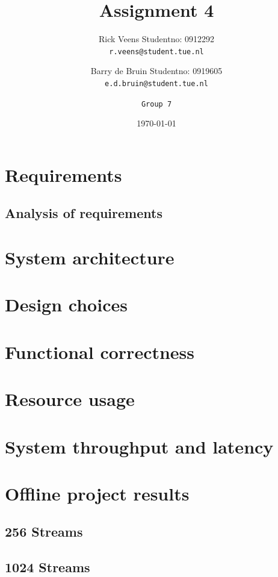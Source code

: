 \documentclass[a4paper,twoside,11pt, fleqn]{article}
\title{\vspace{-\baselineskip}\sffamily\bfseries Assignment 4}
\author{
	Rick Veens \qquad Studentno: 0912292\\
	\texttt{r.veens@student.tue.nl}
	\and
	Barry de Bruin \qquad Studentno: 0919605\\
	\texttt{e.d.bruin@student.tue.nl}
	\and
	\texttt{Group 7}
}
\date{\today}
\begin{document}
\maketitle
\newpage

\tableofcontents

\newpage

\section{Requirements}
\subsection{Analysis of requirements}
\section{System architecture}
\section{Design choices}
\section{Functional correctness}
\section{Resource usage}
\section{System throughput and latency}
\section{Offline project results}
\subsection{256 Streams}
\subsection{1024 Streams}
\end{document}
